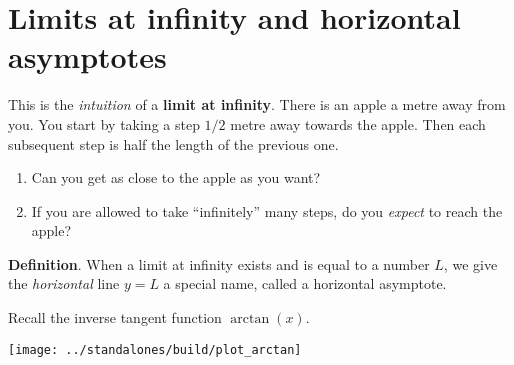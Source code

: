 \documentclass[../main.tex]{subfiles}
\begin{document}
\section{Limits at infinity and horizontal asymptotes}

This is the \emph{intuition} of a \textbf{limit at infinity}. There is an apple a metre away from you. You start by taking a step \(1/2\) metre away towards the apple. Then each subsequent step is half the length of the previous one. 

\begin{center}
\end{center}
\begin{enumerate}[label=(\alph*)]
  \item Can you get as close to the apple as you want?
    \vspace{1em}
  \item If you are allowed to take ``infinitely'' many steps, do you \emph{expect} to reach the apple?
    \vspace{1em}
\end{enumerate}
\vfill

\begin{mdframed}[style=withref]
  \textbf{Definition}. When a limit at infinity exists and is equal to a number \(L\), we give the \emph{horizontal} line \(y=L\) a special name, called a {horizontal asymptote.}

\end{mdframed}
\clearpage

\begin{example}
  Recall the inverse tangent function \(\arctan(x)\).

  \texttt{[image: ../standalones/build/plot\_arctan]}
\end{example}
\vspace{1in}
\end{document}
